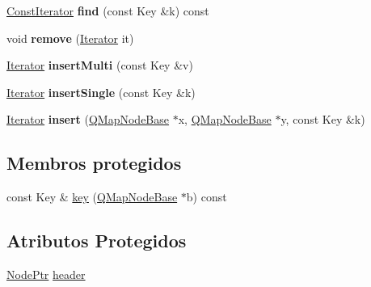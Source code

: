 \begin{DoxyCompactItemize}
\item 
\hypertarget{class_q_map_private_a8467f6126b2aa4feb7f9ff84551a76e4}{\hyperlink{class_q_map_const_iterator}{Const\-Iterator} {\bfseries find} (const Key \&k) const }\label{class_q_map_private_a8467f6126b2aa4feb7f9ff84551a76e4}

\item 
\hypertarget{class_q_map_private_a1429b885adbfe9075b0e36a034b5b54c}{void {\bfseries remove} (\hyperlink{class_q_map_private_a8037b7e85b3b6dc9ae44eccdf67eccb6}{Iterator} it)}\label{class_q_map_private_a1429b885adbfe9075b0e36a034b5b54c}

\item 
\hypertarget{class_q_map_private_a5728163e38d8321beeb6f0852c0122a1}{\hyperlink{class_q_map_private_a8037b7e85b3b6dc9ae44eccdf67eccb6}{Iterator} {\bfseries insert\-Multi} (const Key \&v)}\label{class_q_map_private_a5728163e38d8321beeb6f0852c0122a1}

\item 
\hypertarget{class_q_map_private_a69eb93cfd45d9d620fc3620dc6312a76}{\hyperlink{class_q_map_private_a8037b7e85b3b6dc9ae44eccdf67eccb6}{Iterator} {\bfseries insert\-Single} (const Key \&k)}\label{class_q_map_private_a69eb93cfd45d9d620fc3620dc6312a76}

\item 
\hypertarget{class_q_map_private_a8984c5d17a1f043e73999dfaeb782d96}{\hyperlink{class_q_map_private_a8037b7e85b3b6dc9ae44eccdf67eccb6}{Iterator} {\bfseries insert} (\hyperlink{struct_q_map_node_base}{Q\-Map\-Node\-Base} $\ast$x, \hyperlink{struct_q_map_node_base}{Q\-Map\-Node\-Base} $\ast$y, const Key \&k)}\label{class_q_map_private_a8984c5d17a1f043e73999dfaeb782d96}

\end{DoxyCompactItemize}
\subsection*{Membros protegidos}
\begin{DoxyCompactItemize}
\item 
const Key \& \hyperlink{class_q_map_private_a443262a5684b5e41976fede580b9c817}{key} (\hyperlink{struct_q_map_node_base}{Q\-Map\-Node\-Base} $\ast$b) const 
\end{DoxyCompactItemize}
\subsection*{Atributos Protegidos}
\begin{DoxyCompactItemize}
\item 
\hyperlink{struct_q_map_node}{Node\-Ptr} \hyperlink{class_q_map_private_ab205bb945635f9ba0473b5fafbea11ed}{header}
\end{DoxyCompactItemize}
